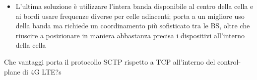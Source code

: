 \begin{questions}
\begin{solution}
\begin{itemize}
            \item L'ultima soluzione è utilizzare l'intera banda disponibile al centro della cella e ai bordi usare frequenze diverse per celle adiacenti; porta a un migliore uso della banda ma richiede un coordinamento più sofisticato tra le BS, oltre che riuscire a posizionare in maniera abbastanza precisa i dispositivi all'interno della cella
        \end{itemize}
    \end{solution}
    
    \question Che vantaggi porta il protocollo SCTP rispetto a TCP all'interno del control-plane di 4G LTE?s
    
    \begin{solution}
        
    \end{solution}
\end{questions}